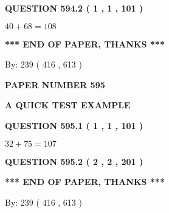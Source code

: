 \documentclass[12pt]{article}
\begin{document}
{\textbf{\Large{QUESTION
594.2 
 ( 1 , 1 , 101 )
}}}
  
  
 
 

$ %
40 +  %
68=   %
108$
 
 
   
   
 \vspace{0.2in}
 
   
   
   
   
\vspace{1.0in} 
{\textbf{\large{ *** END OF PAPER, THANKS *** }}} 
   
   
\hspace{1.0in} By: 
 239 ( 416 ,  613 )
   
   
   
   
\newpage 
\setcounter{page}{ 
   595001 } 
   
   
   
   
 {\textbf{ \Large{ PAPER NUMBER  595  }}}
   
   
\vspace{0.2in}
   
   
   
   
   
   
 \vspace{0.2in}
{\LARGE {\textbf{ A QUICK TEST EXAMPLE}}}
   
   
  
\vspace{0.2in}
  
{\textbf{\Large{QUESTION
595.1 
 ( 1 , 1 , 101 )
}}}
  
  
 
 

$ %
32 +  %
75=   %
107$
 
 
  
\vspace{0.2in}
  
{\textbf{\Large{QUESTION
595.2 
 ( 2 , 2 , 201 )
}}}
  
  
   
   
 \vspace{0.2in}
 
   
   
   
   
\vspace{1.0in} 
{\textbf{\large{ *** END OF PAPER, THANKS *** }}} 
   
   
\hspace{1.0in} By: 
 239 ( 416 ,  613 )
   
\end{document}
